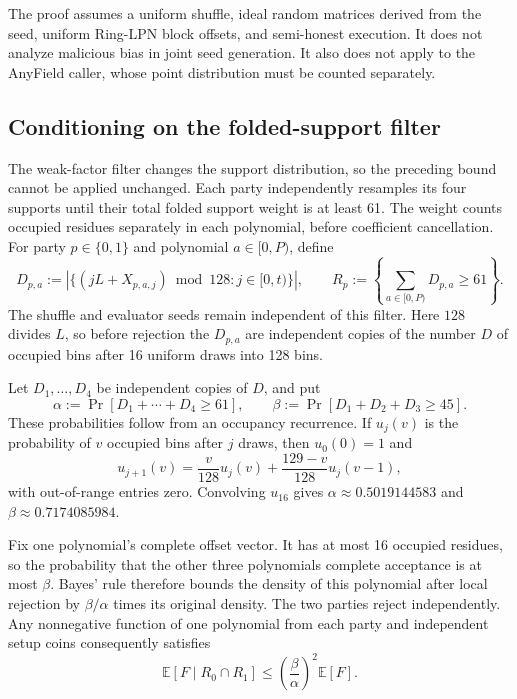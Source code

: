 The proof assumes a uniform shuffle, ideal random matrices derived from the
seed, uniform Ring-LPN block offsets, and semi-honest execution.  It does not
analyze malicious bias in joint seed generation.  It also does not apply to
the AnyField caller, whose point distribution must be counted separately.

\subsection{Conditioning on the folded-support filter}
\label{app:rc-hash-conditioning}

The weak-factor filter changes the support distribution, so the preceding
bound cannot be applied unchanged.  Each party independently resamples its
four supports until their total folded support weight is at least 61.
The weight counts occupied residues separately in each polynomial, before
coefficient cancellation.  For party $p\in\{0,1\}$ and polynomial $a\in[0,P)$,
define
\[
 D_{p,a}:=\left|\{(jL+X_{p,a,j})\bmod128:j\in[0,t)\}\right|,
 \qquad
 R_p:=\left\{\sum_{a\in[0,P)}D_{p,a}\ge61\right\}.
\]
The shuffle and evaluator seeds remain independent of this filter.
Here $128$ divides $L$, so before rejection the $D_{p,a}$ are independent
copies of the number $D$ of occupied bins after 16 uniform draws into 128 bins.

Let $D_1,\ldots,D_4$ be independent copies of $D$, and put
\[
 \alpha:=\Pr[D_1+\cdots+D_4\ge61],
 \qquad
 \beta:=\Pr[D_1+D_2+D_3\ge45].
\]
These probabilities follow from an occupancy recurrence.  If $u_j(v)$ is
the probability of $v$ occupied bins after $j$ draws, then $u_0(0)=1$ and
\[
 u_{j+1}(v)=\frac{v}{128}u_j(v)
          +\frac{129-v}{128}u_j(v-1),
\]
with out-of-range entries zero.  Convolving $u_{16}$ gives
$\alpha\approx0.5019144583$ and $\beta\approx0.7174085984$.

Fix one polynomial's complete offset vector.  It has at most 16 occupied
residues, so the probability that the other three polynomials complete
acceptance is at most $\beta$.  Bayes' rule therefore bounds the density of
this polynomial after local rejection by $\beta/\alpha$ times its original
density.  The two parties reject independently.  Any nonnegative function
of one polynomial from each party and independent setup coins consequently
satisfies
\begin{equation}\label{eq:rc-pair-conditioning}
 \mathbb E[F\mid R_0\cap R_1]
 \le \left(\frac{\beta}{\alpha}\right)^2\mathbb E[F].
\end{equation}

